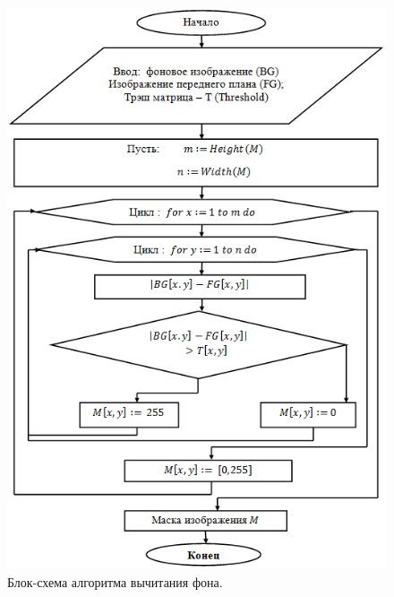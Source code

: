 \begin{figure}[ht!]
\centering
\begin{center}
\includegraphics [scale=1] {images/h10.png}
\caption{Блок-схема алгоритма вычитания фона.} \label{img10}
\end{center}
\end{figure}

